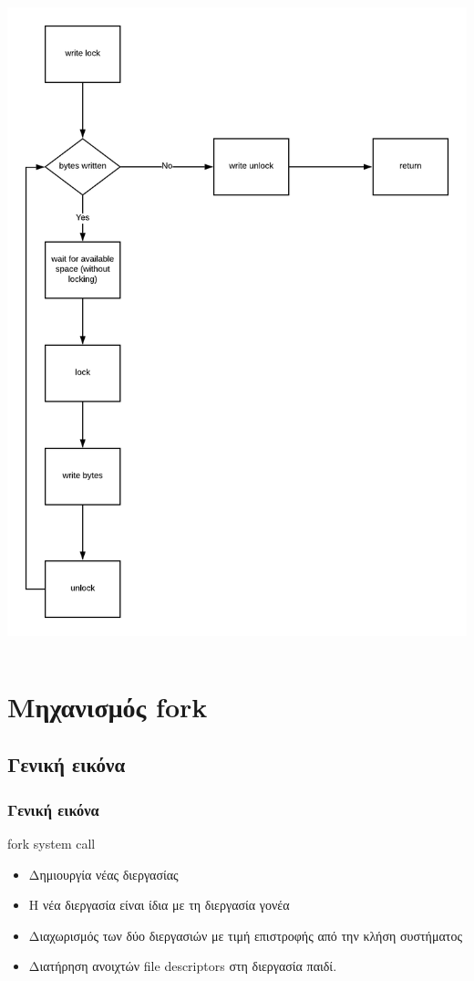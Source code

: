 \documentclass[red,slidestop,notes,compress,mathserif]{beamer}
\begin{document}
\begin{frame}
\begin{columns}
\includegraphics[scale=0.4]{figures/pipe_write.png}
\end{columns}
\end{frame}

\section{Μηχανισμός fork}
\subsection{Γενική εικόνα}
\begin{frame}
\frametitle{Γενική εικόνα}
\begin{block}{fork system call}
\begin{itemize}
\item Δημιουργία νέας διεργασίας
\item Η νέα διεργασία είναι ίδια με τη διεργασία γονέα
\item Διαχωρισμός των δύο διεργασιών με τιμή επιστροφής από την κλήση συστήματος
\item Διατήρηση ανοιχτών file descriptors στη διεργασία παιδί.
\end{itemize}
\end{block}
\end{frame}
\end{document}
